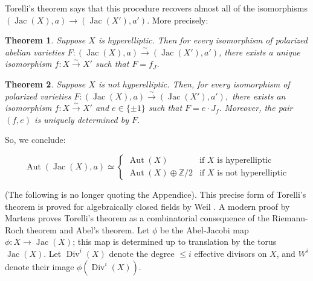 \documentclass[12pt,reqno]{amsart}
\DeclareMathOperator{\Aut}{Aut}
\DeclareMathOperator{\Jac}{Jac}
\DeclareMathOperator{\Div}{Div}
\newcommand{\Z}{\mathbb{Z}}
\newtheorem*{thm*}{Theorem}
\theoremstyle{definition}
\theoremstyle{remark}
\newtheorem*{remark}{Remark}
\begin{document}

Torelli's theorem says that this procedure recovers almost all of the isomorphisms $(\Jac(X), a) \to (\Jac(X'), a')$. More precisely:

\begin{thm*} Suppose $X$ is hyperelliptic.  Then for every isomorphism of polarized abelian varieties $F: (\operatorname{Jac}(X),a) \stackrel{\sim}{\rightarrow} (\operatorname{Jac}(X'),a')$, there exists a unique isomorphism $f: X \stackrel{\sim}{\rightarrow} X'$ such that $F = f_J$.  \end{thm*}

\begin{thm*} Suppose $X$ is not hyperelliptic.  Then, for every isomorphism of polarized varieties $F: (\operatorname{Jac}(X),a) \stackrel{\sim}{\rightarrow} (\operatorname{Jac}(X'),a'),$ there exists an isomorphism $f: X \stackrel{\sim}{\rightarrow} X'$ and $e \in \{ \pm 1\}$ such that $F = e \cdot  J_f$.  Moreover, the pair $(f,e)$ is uniquely determined by $F$. \end{thm*}

So, we conclude: 

$$\Aut(\Jac(X), a) \simeq \begin{cases} \Aut(X) & \text{if } X \text{ is hyperelliptic} \\
\Aut(X) \oplus \Z/2 &  \text{if } X \text{ is not hyperelliptic}
\end{cases} $$



(The following is no longer quoting the Appendice). This precise form of Torelli's theorem is proved for algebraically closed fields by Weil \cite{oe}. A modern proof by Martens \cite{finn} proves Torelli's theorem as a combinatorial consequence of the Riemann-Roch theorem and Abel's theorem. Let $\phi$ be the Abel-Jacobi map $\phi: X \to \Jac(X)$; this map is determined up to translation by the torus $\Jac(X)$. Let $\Div^i(X)$ denote the degree $\leq i$ effective divisors on $X$, and $W^i$ denote their image $\phi(\Div^i(X))$. 
\end{document}
